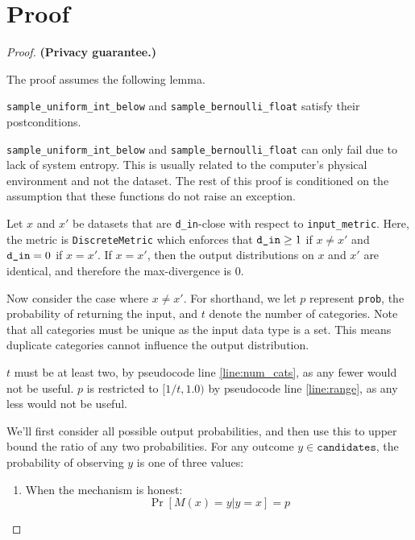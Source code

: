 \documentclass{article}
\begin{document}
 
\section{Proof} 
 
\begin{proof}  
\textbf{(Privacy guarantee.)}  
     
\begin{tcolorbox} 
    The proof assumes the following lemma. 
    \begin{lemma} 
        \texttt{sample\_uniform\_int\_below} and \texttt{sample\_bernoulli\_float} satisfy their postconditions. 
    \end{lemma} 
\end{tcolorbox} 
 
\texttt{sample\_uniform\_int\_below} and \texttt{sample\_bernoulli\_float} can only fail due to lack of system entropy.  
This is usually related to the computer's physical environment and not the dataset.  
The rest of this proof is conditioned on the assumption that these functions do not raise an exception.  
 
Let $x$ and $x'$ be datasets that are \texttt{d\_in}-close with respect to \texttt{input\_metric}. 
Here, the metric is \texttt{DiscreteMetric} which enforces that $\texttt{d\_in} \geq 1$ if $x \ne x'$ and $\texttt{d\_in} = 0$ if $x = x'$.  
If $x = x'$, then the output distributions on $x$ and $x'$ are identical, and therefore the max-divergence is 0. 
 
Now consider the case where $x \ne x'$.  
For shorthand, we let $p$ represent \texttt{prob}, the probability of returning the input, 
and $t$ denote the number of categories. 
Note that all categories must be unique as the input data type is a set. 
This means duplicate categories cannot influence the output distribution. 
 
$t$ must be at least two, by pseudocode line \ref{line:num_cats}, as any fewer would not be useful. 
$p$ is restricted to $[1/t, 1.0)$ by pseudocode line \ref{line:range}, as any less would not be useful. 
 
We'll first consider all possible output probabilities,  
and then use this to upper bound the ratio of any two probabilities. 
For any outcome $y \in \texttt{candidates}$,  
the probability of observing $y$ is one of three values: 
 
\begin{enumerate} 
    \item When the mechanism is honest:  
    \[ 
        \Pr[M(x) = y | y = x] = p 
    \] 
 

\end{enumerate}
\end{proof}
\end{document}
